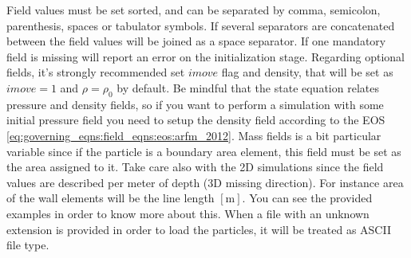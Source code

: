 %
Field values must be set sorted, and can be separated by comma,
semicolon, parenthesis, spaces or tabulator symbols. If several
separators are concatenated between the field values will be
joined as a space separator.\rc
%
If one mandatory field is missing \NAME will report an error on
the initialization stage. Regarding optional fields,
it's strongly recommended set $imove$ flag and density, that will
be set as $imove = 1$ and $\rho = \rho_0$ by default. Be mindful
that the state equation relates pressure and density fields, so if
you want to perform a simulation with some initial pressure field
you need to setup the density field according to the EOS
\ref{eq:governing_eqns:field_eqns:eos:arfm_2012}.\rc
%
Mass fields is a bit particular variable since if the particle is
a boundary area element, this field must be set as the area
assigned to it.\rc
%
Take care also with the 2D simulations since the field values are
described per meter of depth (3D missing direction). For instance
area of the wall elements will be the line length $[\mbox{m}]$.
You can see the provided examples in order to know more about this.\rc
%
When a file with an unknown extension is provided in order to load
the particles, it will be treated as ASCII file type.
%
